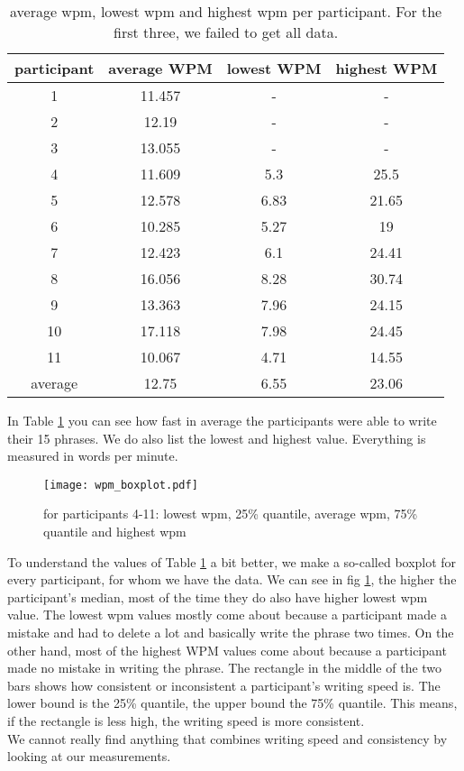 \begin{table}[ht!]
    \centering
    \caption{average wpm, lowest wpm and highest wpm per participant. For the first three, we failed to get all data.}
    \begin{tabular}{cccc} \toprule
        participant&average WPM&lowest WPM&highest WPM\\ \midrule
        1 & 11.457 & - & -\\ 
        2 & 12.19 & - & -\\
        3 & 13.055 & - & -\\ 
        4 & 11.609 & 5.3 & 25.5\\
        5 & 12.578 & 6.83 & 21.65\\
        6 & 10.285 & 5.27 & 19\\
        7 & 12.423 & 6.1 & 24.41\\
        8 & 16.056 & 8.28 & 30.74\\
        9 & 13.363 & 7.96 & 24.15\\
        10 & 17.118 & 7.98 & 24.45\\
        11 & 10.067 & 4.71 & 14.55\\
        \bottomrule
        average&12.75&6.55&23.06\\
        \bottomrule
    \end{tabular}
    \label{tab:WPM}
\end{table}

In Table \ref{tab:WPM} you can see how fast in average the participants were able to write their 15 phrases. We do also list the lowest and highest value. Everything is measured in words per minute.

\begin{figure}[H]
    \centering
    \texttt{[image: wpm\_boxplot.pdf]}
    \caption{for participants 4-11: lowest wpm, 25\% quantile, average wpm, 75\% quantile and highest wpm}
    \label{fig:WPM}
\end{figure}
To understand the values of Table \ref{tab:WPM} a bit better, we make a so-called boxplot for every participant, for whom we have the data. We can see in fig \ref{fig:WPM}, the higher the participant's median, most of the time they do also have higher lowest wpm value. The lowest wpm values mostly come about because a participant made a mistake and had to delete a lot and basically write the phrase two times. On the other hand, most of the highest WPM values come about because a participant made no mistake in writing the phrase. The rectangle in the middle of the two bars shows how consistent or inconsistent a participant's writing speed is. The lower bound is the 25\% quantile, the upper bound the 75\% quantile. This means, if the rectangle is less high, the writing speed is more consistent.\\
We cannot really find anything that combines writing speed and consistency by looking at our measurements.\\

